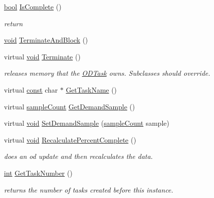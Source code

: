 \begin{DoxyCompactItemize}
\hyperlink{mac_2config_2i386_2lib-src_2libsoxr_2soxr-config_8h_abb452686968e48b67397da5f97445f5b}{bool} \hyperlink{class_o_d_task_a8753fd6fa8de7ca45b8ba4cf88cd75d5}{Is\+Complete} ()
\begin{DoxyCompactList}\small\item\em return \end{DoxyCompactList}\item 
\hyperlink{sound_8c_ae35f5844602719cf66324f4de2a658b3}{void} \hyperlink{class_o_d_task_a5aced75c29548ca75bd363b223d02216}{Terminate\+And\+Block} ()
\item 
virtual \hyperlink{sound_8c_ae35f5844602719cf66324f4de2a658b3}{void} \hyperlink{class_o_d_task_a80d76840ecaa7efb4b5f42aadd84884c}{Terminate} ()
\begin{DoxyCompactList}\small\item\em releases memory that the \hyperlink{class_o_d_task}{O\+D\+Task} owns. Subclasses should override. \end{DoxyCompactList}\item 
virtual \hyperlink{getopt1_8c_a2c212835823e3c54a8ab6d95c652660e}{const} char $\ast$ \hyperlink{class_o_d_task_af7c7ff0cadb3ac71bf582d74731204af}{Get\+Task\+Name} ()
\item 
virtual \hyperlink{include_2audacity_2_types_8h_afa427e1f521ea5ec12d054e8bd4d0f71}{sample\+Count} \hyperlink{class_o_d_task_ace2d7a68e5f8681025c539000487aa81}{Get\+Demand\+Sample} ()
\item 
virtual \hyperlink{sound_8c_ae35f5844602719cf66324f4de2a658b3}{void} \hyperlink{class_o_d_task_aee81f26145371152b579f16c90af78cb}{Set\+Demand\+Sample} (\hyperlink{include_2audacity_2_types_8h_afa427e1f521ea5ec12d054e8bd4d0f71}{sample\+Count} sample)
\item 
virtual \hyperlink{sound_8c_ae35f5844602719cf66324f4de2a658b3}{void} \hyperlink{class_o_d_task_a5c6c1265c7f3abe2de27c77806cb6819}{Recalculate\+Percent\+Complete} ()
\begin{DoxyCompactList}\small\item\em does an od update and then recalculates the data. \end{DoxyCompactList}\item 
\hyperlink{xmltok_8h_a5a0d4a5641ce434f1d23533f2b2e6653}{int} \hyperlink{class_o_d_task_a66343a5bc3e8482459ef2419abe5157a}{Get\+Task\+Number} ()
\begin{DoxyCompactList}\small\item\em returns the number of tasks created before this instance. \end{DoxyCompactList}\item 

\end{DoxyCompactItemize}
